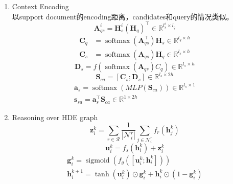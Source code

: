 \documentclass[a4paper,UTF8]{article}
\numberwithin{equation}{section}
\begin{document}
\begin{enumerate}
	\item Context Encoding\\以support document的encoding距离，candidates和query的情况类似。
	\begin{equation}
		\mathbf{A}_{q s}^{i}=\mathbf{H}_{s}^{i}\left(\mathbf{H}_{q}\right)^{\top} \in \mathbb{R}^{l_{s}^{i} \times l_{q}}
		\end{equation}
		\begin{equation}
		\begin{aligned} \mathbf{C}_{q} &=\operatorname{softmax}\left(\mathbf{A}_{q s}^{\top}\right) \mathbf{H}_{s} \in \mathbb{R}^{l_{q} \times h} \\ \mathbf{C}_{s} &=\operatorname{softmax}\left(\mathbf{A}_{q s}\right) \mathbf{H}_{q} \in \mathbb{R}^{l_{s} \times h} \end{aligned}
		\end{equation}
		\begin{equation}
			\mathbf{D}_{s}=f\left(\operatorname{softmax}\left(\mathbf{A}_{q s}\right) C_{q}\right) \in \mathbb{R}^{l_{s} \times h}
			\end{equation}
			\begin{equation}
				\mathbf{S}_{c a}=\left[\mathbf{C}_{s} ; \mathbf{D}_{s}\right] \in \mathbb{R}^{l_{s} \times 2 h}
				\end{equation}
				\begin{equation}
				\begin{array}{c}{\mathbf{a}_{s}=\operatorname{softmax}\left(M L P\left(\mathbf{S}_{c a}\right)\right) \in \mathbb{R}^{l_{s} \times 1}} \\ {\mathbf{s}_{s a}=\mathbf{a}_{s}^{\top} \mathbf{S}_{c a} \in \mathbb{R}^{1 \times 2 h}}\end{array}
				\end{equation}
	\item Reasoning over HDE graph\\
	\begin{equation}
		\mathbf{z}_{i}^{k}=\sum_{r \in \mathcal{R}} \frac{1}{\left|\mathcal{N}_{i}^{r}\right|} \sum_{j \in \mathcal{N}_{i}^{r}} f_{r}\left(\mathbf{h}_{j}^{k}\right)
		\end{equation}
		\begin{equation}
			\mathbf{u}_{i}^{k}=f_{s}\left(\mathbf{h}_{i}^{k}\right)+\mathbf{z}_{i}^{k}
			\end{equation}
			\begin{equation}
			\begin{array}{c}{\mathbf{g}_{i}^{k}=\operatorname{sigmoid}\left(f_{g}\left(\left[\mathbf{u}_{i}^{k} ; \mathbf{h}_{i}^{k}\right]\right)\right)} \\ {\mathbf{h}_{i}^{k+1}=\tanh \left(\mathbf{u}_{i}^{k}\right) \odot \mathbf{g}_{i}^{k}+\mathbf{h}_{i}^{k} \odot\left(1-\mathbf{g}_{i}^{k}\right)}\end{array}

\end{equation}
\end{enumerate}
\end{document}
